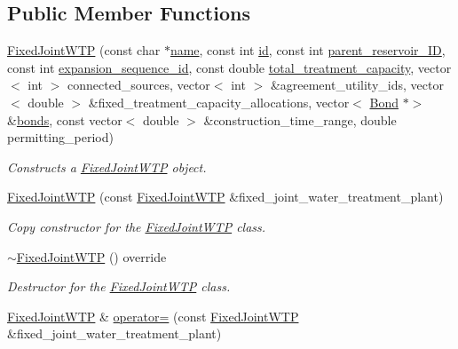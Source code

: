 \subsection*{Public Member Functions}
\begin{DoxyCompactItemize}
\item 
\mbox{\hyperlink{classFixedJointWTP_a4c9f0d469ea60620d3f2441d3c2f3aaf}{Fixed\+Joint\+W\+TP}} (const char $\ast$\mbox{\hyperlink{classWaterSource_a846ea74c5b453d014f594d41fee8c765}{name}}, const int \mbox{\hyperlink{classWaterSource_a6eafe5dfefd317877d1244e8a7c6e742}{id}}, const int \mbox{\hyperlink{classJointWTP_aa5830cb4d3013a004b7168f4dbf475eb}{parent\+\_\+reservoir\+\_\+\+ID}}, const int \mbox{\hyperlink{classJointWTP_a0e10a7f7ade04d5f3572f185de1b8653}{expansion\+\_\+sequence\+\_\+id}}, const double \mbox{\hyperlink{classWaterSource_a2fdfd5ff7d103e71108cf2a31babaccb}{total\+\_\+treatment\+\_\+capacity}}, vector$<$ int $>$ connected\+\_\+sources, vector$<$ int $>$ \&agreement\+\_\+utility\+\_\+ids, vector$<$ double $>$ \&fixed\+\_\+treatment\+\_\+capacity\+\_\+allocations, vector$<$ \mbox{\hyperlink{classBond}{Bond}} $\ast$$>$ \&\mbox{\hyperlink{classWaterSource_a413b094e11bdce62f4d82e5bb9e4706e}{bonds}}, const vector$<$ double $>$ \&construction\+\_\+time\+\_\+range, double permitting\+\_\+period)
\begin{DoxyCompactList}\small\item\em Constructs a \mbox{\hyperlink{classFixedJointWTP}{Fixed\+Joint\+W\+TP}} object. \end{DoxyCompactList}\item 
\mbox{\hyperlink{classFixedJointWTP_accf60b3a2b9907231a816135772261f8}{Fixed\+Joint\+W\+TP}} (const \mbox{\hyperlink{classFixedJointWTP}{Fixed\+Joint\+W\+TP}} \&fixed\+\_\+joint\+\_\+water\+\_\+treatment\+\_\+plant)
\begin{DoxyCompactList}\small\item\em Copy constructor for the \mbox{\hyperlink{classFixedJointWTP}{Fixed\+Joint\+W\+TP}} class. \end{DoxyCompactList}\item 
\mbox{\hyperlink{classFixedJointWTP_a9c42b1420843421c045feeb489b07b95}{$\sim$\+Fixed\+Joint\+W\+TP}} () override
\begin{DoxyCompactList}\small\item\em Destructor for the \mbox{\hyperlink{classFixedJointWTP}{Fixed\+Joint\+W\+TP}} class. \end{DoxyCompactList}\item 
\mbox{\hyperlink{classFixedJointWTP}{Fixed\+Joint\+W\+TP}} \& \mbox{\hyperlink{classFixedJointWTP_ad8cade8e61f861485b025cb0afe28c1a}{operator=}} (const \mbox{\hyperlink{classFixedJointWTP}{Fixed\+Joint\+W\+TP}} \&fixed\+\_\+joint\+\_\+water\+\_\+treatment\+\_\+plant)
$$
\end{DoxyCompactItemize}
